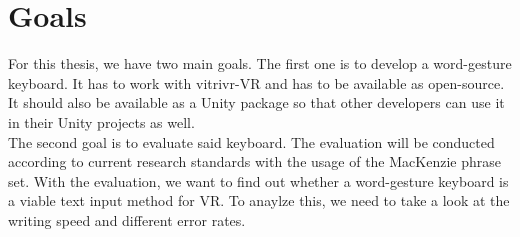 \section{Goals}
For this thesis, we have two main goals. The first one is to develop a word-gesture keyboard. It has to work with vitrivr-VR and has to be available as open-source. It should also be available as a Unity package so that other developers can use it in their Unity projects as well. \\
The second goal is to evaluate said keyboard. The evaluation will be conducted according to current research standards with the usage of the MacKenzie phrase set. With the evaluation, we want to find out whether a word-gesture keyboard is a viable text input method for VR. To anaylze this, we need to take a look at the writing speed and different error rates.